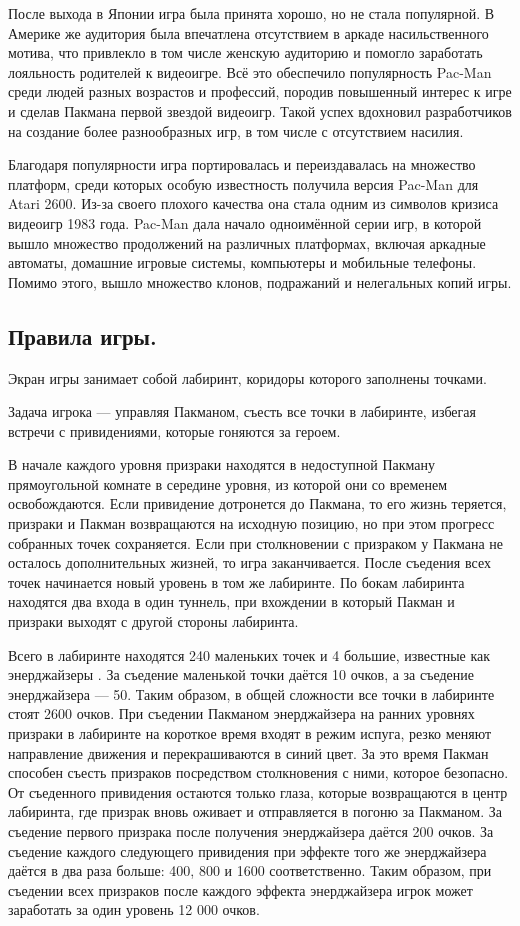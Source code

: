 После выхода в Японии игра была принята хорошо, но не стала популярной. В Америке же аудитория была впечатлена отсутствием в аркаде насильственного мотива, что привлекло в том числе женскую аудиторию и помогло заработать лояльность родителей к видеоигре. Всё это обеспечило популярность Pac-Man среди людей разных возрастов и профессий, породив повышенный интерес к игре и сделав Пакмана первой звездой видеоигр. Такой успех вдохновил разработчиков на создание более разнообразных игр, в том числе с отсутствием насилия.

Благодаря популярности игра портировалась и переиздавалась на множество платформ, среди которых особую известность получила версия Pac-Man для Atari 2600. Из-за своего плохого качества она стала одним из символов кризиса видеоигр 1983 года. Pac-Man дала начало одноимённой серии игр, в которой вышло множество продолжений на различных платформах, включая аркадные автоматы, домашние игровые системы, компьютеры и мобильные телефоны. Помимо этого, вышло множество клонов, подражаний и нелегальных копий игры.

\subsection{\label{subsec:ch01/sec04/subsec02}Правила игры.}
Экран игры занимает собой лабиринт, коридоры которого заполнены точками.

Задача игрока --- управляя Пакманом, съесть все точки в лабиринте, избегая встречи с привидениями, которые гоняются за героем.

В начале каждого уровня призраки находятся в недоступной Пакману прямоугольной комнате в середине уровня, из которой они со временем освобождаются. Если привидение дотронется до Пакмана, то его жизнь теряется, призраки и Пакман возвращаются на исходную позицию, но при этом прогресс собранных точек сохраняется. Если при столкновении с призраком у Пакмана не осталось дополнительных жизней, то игра заканчивается. После съедения всех точек начинается новый уровень в том же лабиринте. По бокам лабиринта находятся два входа в один туннель, при вхождении в который Пакман и призраки выходят с другой стороны лабиринта.

Всего в лабиринте находятся 240 маленьких точек и 4 большие, известные как энерджайзеры . За съедение маленькой точки даётся 10 очков, а за съедение энерджайзера — 50. Таким образом, в общей сложности все точки в лабиринте стоят 2600 очков. При съедении Пакманом энерджайзера на ранних уровнях призраки в лабиринте на короткое время входят в режим испуга, резко меняют направление движения и перекрашиваются в синий цвет. За это время Пакман способен съесть призраков посредством столкновения с ними, которое безопасно. От съеденного привидения остаются только глаза, которые возвращаются в центр лабиринта, где призрак вновь оживает и отправляется в погоню за Пакманом. За съедение первого призрака после получения энерджайзера даётся 200 очков. За съедение каждого следующего привидения при эффекте того же энерджайзера даётся в два раза больше: 400, 800 и 1600 соответственно. Таким образом, при съедении всех призраков после каждого эффекта энерджайзера игрок может заработать за один уровень 12 000 очков.


